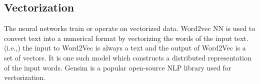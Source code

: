 \subsection{Vectorization}

The neural networks train or operate on vectorized data. Word2vec NN is used to
convert text into a numerical format by vectorizing the words of the input text. (i.e.,) the input to Word2Vec is always a text and the output of Word2Vec is a set of vectors.
It is one such model which constructs a distributed representation of the input words.
Gensim is a popular open-source NLP library used for vectorization.
